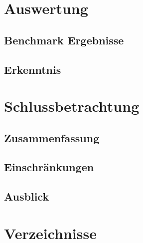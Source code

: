 \documentclass[11pt, a4paper]{book}
\begin{document}
\pagestyle{fancy}


\cleardoublepage


\frontmatter



\mainmatter











\chapter{Auswertung}

\section{Benchmark Ergebnisse}
\section{Erkenntnis}

\chapter{Schlussbetrachtung}
\section{Zusammenfassung}
\section{Einschränkungen}
\section{Ausblick}




\chapter{Verzeichnisse}

\end{document}
